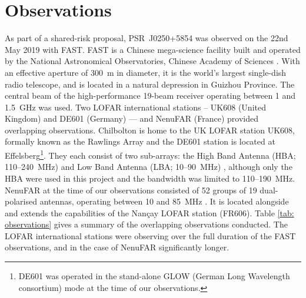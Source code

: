 \section{Observations}
\label{sec: J0250 - observations}

As part of a shared-risk proposal, PSR~J0250+5854 was observed on the 22nd May 2019 with FAST. FAST is a Chinese mega-science facility built and operated by the National Astronomical Observatories, Chinese Academy of Sciences \citep{NLJ+2011, LWQ+2018}. With an effective aperture of 300~m in diameter, it is the world's largest single-dish radio telescope, and is located in a natural depression in Guizhou Province. The central beam of the high-performance 19-beam receiver operating between 1 and 1.5~GHz \citep{JTH+2020} was used. Two LOFAR international stations -- UK608 (United Kingdom) and DE601 (Germany) --- and NenuFAR (France) provided overlapping observations. Chilbolton is home to the UK LOFAR station UK608, formally known as the Rawlings Array and the DE601 station is located at Effelsberg\footnote{DE601 was operated in the stand-alone GLOW (German Long Wavelength consortium) mode at the time of our observations.}. They each consist of two sub-arrays: the High Band Antenna (HBA; 110--240~MHz) and Low Band Antenna (LBA; 10--90~MHz) \citep{HWG+2013, SHA+2011}, although only the HBA were used in this project and the bandwidth was limited to 110--190~MHz. NenuFAR at the time of our observations consisted of 52 groups of 19 dual-polarised antennas, operating between 10 and 85~MHz \citep{ZDT+2020}. It is located alongside and extends the capabilities of the Nan\c{c}ay LOFAR station (FR606). Table \ref{tab: observations} gives a summary of the overlapping observations conducted. The LOFAR international stations were observing over the full duration of the FAST observations, and in the case of NenuFAR significantly longer.

